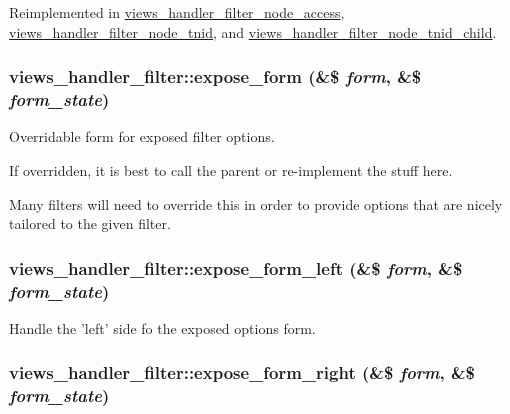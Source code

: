 Reimplemented in \hyperlink{classviews__handler__filter__node__access_20eacba1b9be3c0e6b8245191b60a9ff}{views\_\-handler\_\-filter\_\-node\_\-access}, \hyperlink{classviews__handler__filter__node__tnid_9e6111d77af1aefee0b78d7b3b2c25cc}{views\_\-handler\_\-filter\_\-node\_\-tnid}, and \hyperlink{classviews__handler__filter__node__tnid__child_2c6527f01666eaf0ba38eff4798ec732}{views\_\-handler\_\-filter\_\-node\_\-tnid\_\-child}.\hypertarget{classviews__handler__filter_9537c9a30fb9008361efdfdde46633cd}{
\subsubsection[{expose\_\-form}]{\setlength{\rightskip}{0pt plus 5cm}views\_\-handler\_\-filter::expose\_\-form (\&\$ {\em form}, \/  \&\$ {\em form\_\-state})}}
\label{classviews__handler__filter_9537c9a30fb9008361efdfdde46633cd}


Overridable form for exposed filter options.

If overridden, it is best to call the parent or re-implement the stuff here.

Many filters will need to override this in order to provide options that are nicely tailored to the given filter. \hypertarget{classviews__handler__filter_649a8a303815d4013500716cb1f0f8bc}{
\subsubsection[{expose\_\-form\_\-left}]{\setlength{\rightskip}{0pt plus 5cm}views\_\-handler\_\-filter::expose\_\-form\_\-left (\&\$ {\em form}, \/  \&\$ {\em form\_\-state})}}
\label{classviews__handler__filter_649a8a303815d4013500716cb1f0f8bc}


Handle the 'left' side fo the exposed options form. \hypertarget{classviews__handler__filter_5f175df5f03b5e4e23e4168870de05d8}{
\subsubsection[{expose\_\-form\_\-right}]{\setlength{\rightskip}{0pt plus 5cm}views\_\-handler\_\-filter::expose\_\-form\_\-right (\&\$ {\em form}, \/  \&\$ {\em form\_\-state})}}
\label{classviews__handler__filter_5f175df5f03b5e4e23e4168870de05d8}


